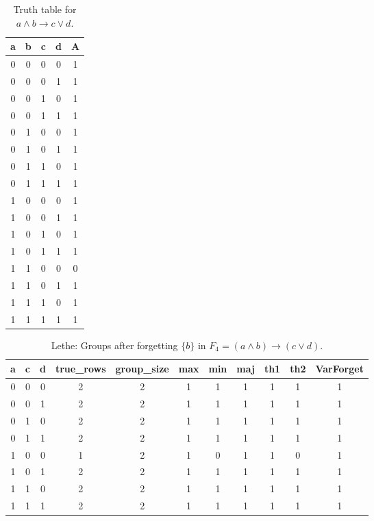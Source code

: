 \begin{table}[!tb]
    \centering
    \begin{tabular}{|c|c|c|c|c|}
        \hline
        \textbf{a} & \textbf{b} & \textbf{c} & \textbf{d} & \textbf{A} \\ \hline
        0 & 0 & 0 & 0 & 1 \\ \hline
        0 & 0 & 0 & 1 & 1 \\ \hline
        0 & 0 & 1 & 0 & 1 \\ \hline
        0 & 0 & 1 & 1 & 1 \\ \hline
        0 & 1 & 0 & 0 & 1 \\ \hline
        0 & 1 & 0 & 1 & 1 \\ \hline
        0 & 1 & 1 & 0 & 1 \\ \hline
        0 & 1 & 1 & 1 & 1 \\ \hline
        1 & 0 & 0 & 0 & 1 \\ \hline
        1 & 0 & 0 & 1 & 1 \\ \hline
        1 & 0 & 1 & 0 & 1 \\ \hline
        1 & 0 & 1 & 1 & 1 \\ \hline
        1 & 1 & 0 & 0 & 0 \\ \hline
        1 & 1 & 0 & 1 & 1 \\ \hline
        1 & 1 & 1 & 0 & 1 \\ \hline
        1 & 1 & 1 & 1 & 1 \\ \hline
    \end{tabular}
    \caption{Truth table for $a \land b \rightarrow c \lor d$.}
    \label{tab:truthtab}
\end{table}

\begin{table}[!tb]
    \centering
    \begin{tabular}{|c|c|c|c|c|c|c|c|c|c|c|}
        \hline
        \textbf{a} & \textbf{c} & \textbf{d} & \textbf{true\_rows} & \textbf{group\_size} & \textbf{max} & \textbf{min} & \textbf{maj} & \textbf{th1} & \textbf{th2} & \textbf{VarForget} \\ \hline
        \rowcolor{gray!40} 0 & 0 & 0 & 2 & 2 & 1 & 1 & 1 & 1 & 1 & 1 \\ \hline
        \rowcolor{blue!40} 0 & 0 & 1 & 2 & 2 & 1 & 1 & 1 & 1 & 1 & 1 \\ \hline
        \rowcolor{red!40} 0 & 1 & 0 & 2 & 2 & 1 & 1 & 1 & 1 & 1 & 1 \\ \hline
        \rowcolor{green!40} 0 & 1 & 1 & 2 & 2 & 1 & 1 & 1 & 1 & 1 & 1 \\ \hline
        \rowcolor{yellow!40} 1 & 0 & 0 & 1 & 2 & 1 & 0 & 1 & 1 & 0 & 1 \\ \hline
        \rowcolor{gray!40} 1 & 0 & 1 & 2 & 2 & 1 & 1 & 1 & 1 & 1 & 1 \\ \hline
        \rowcolor{blue!40} 1 & 1 & 0 & 2 & 2 & 1 & 1 & 1 & 1 & 1 & 1 \\ \hline
        \rowcolor{red!40} 1 & 1 & 1 & 2 & 2 & 1 & 1 & 1 & 1 & 1 & 1 \\ \hline
    \end{tabular}
    \caption{Lethe: Groups after forgetting $\{b\}$ in $F_{4} = (a \land b) \rightarrow (c \lor d)$.}
    \label{tab:lethe-F4-b-groups}
\end{table}
